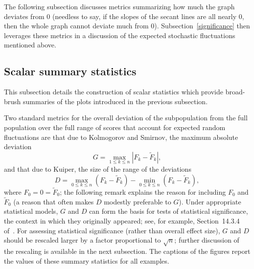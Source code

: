 \documentclass{article}
\begin{document}
The following subsection discusses metrics summarizing
how much the graph deviates from 0 (needless to say,
if the slopes of the secant lines are all nearly 0,
then the whole graph cannot deviate much from 0).
Subsection~\ref{significance} then leverages these metrics in a discussion
of the expected stochastic fluctuations mentioned above.


\subsection{Scalar summary statistics}
\label{scalarstats}

This subsection details the construction of scalar statistics
which provide broad-brush summaries of the plots introduced
in the previous subsection.

Two standard metrics for the overall deviation of the subpopulation
from the full population over the full range of scores
that account for expected random fluctuations are that due
to Kolmogorov and Smirnov, the maximum absolute deviation
%
\begin{equation}
\label{Kolmogorov-Smirnov}
G = \max_{1 \le k \le n} |F_k-\tilde{F}_k|,
\end{equation}
%
and that due to Kuiper, the size of the range of the deviations
%
\begin{equation}
\label{Kuiper}
D = \max_{0 \le k \le n} (F_k-\tilde{F}_k)
  - \min_{0 \le k \le n} (F_k-\tilde{F}_k),
\end{equation}
%
where $F_0 = 0 = \tilde{F}_0$;
the following remark explains the reason for including $F_0$ and $\tilde{F}_0$
(a reason that often makes $D$ modestly preferable to $G$).
Under appropriate statistical models,
$G$ and $D$ can form the basis for tests of statistical significance,
the context in which they originally appeared;
see, for example, Section~14.3.4 of~\cite{press-teukolsky-vetterling-flannery}.
For assessing statistical significance (rather than overall effect size),
$G$ and $D$ should be rescaled larger by a factor proportional to $\sqrt{n}$;
further discussion of the rescaling is available in the next subsection.
The captions of the figures report the values of these summary statistics
for all examples.
\end{document}
